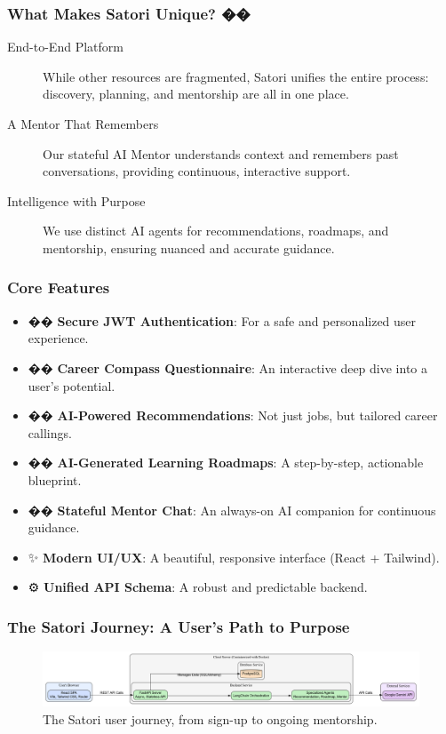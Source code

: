 \documentclass{beamer}
\begin{document}
\begin{frame}
  \frametitle{What Makes Satori Unique? ��}
  \begin{description}
    \item[End-to-End Platform] While other resources are fragmented, Satori unifies the entire process: discovery, planning, and mentorship are all in one place.
    \vspace{0.5cm}
    \item[A Mentor That Remembers] Our stateful AI Mentor understands context and remembers past conversations, providing continuous, interactive support.
    \vspace{0.5cm}
    \item[Intelligence with Purpose] We use distinct AI agents for recommendations, roadmaps, and mentorship, ensuring nuanced and accurate guidance.
  \end{description}
\end{frame}

\begin{frame}
  \frametitle{Core Features}
  \begin{itemize}
    \item �� \textbf{Secure JWT Authentication}: For a safe and personalized user experience.
    \item �� \textbf{Career Compass Questionnaire}: An interactive deep dive into a user's potential.
    \item �� \textbf{AI-Powered Recommendations}: Not just jobs, but tailored career callings.
    \item ��️ \textbf{AI-Generated Learning Roadmaps}: A step-by-step, actionable blueprint.
    \item �� \textbf{Stateful Mentor Chat}: An always-on AI companion for continuous guidance.
    \item ✨ \textbf{Modern UI/UX}: A beautiful, responsive interface (React + Tailwind).
    \item ⚙️ \textbf{Unified API Schema}: A robust and predictable backend.
  \end{itemize}
\end{frame}

\begin{frame}
  \frametitle{The Satori Journey: A User's Path to Purpose}
  \begin{figure}
    \includegraphics[width=\textwidth]{assets/user_flow_diagram.png}
    \caption{The Satori user journey, from sign-up to ongoing mentorship.}
  \end{figure}
\end{frame}
\end{document}
